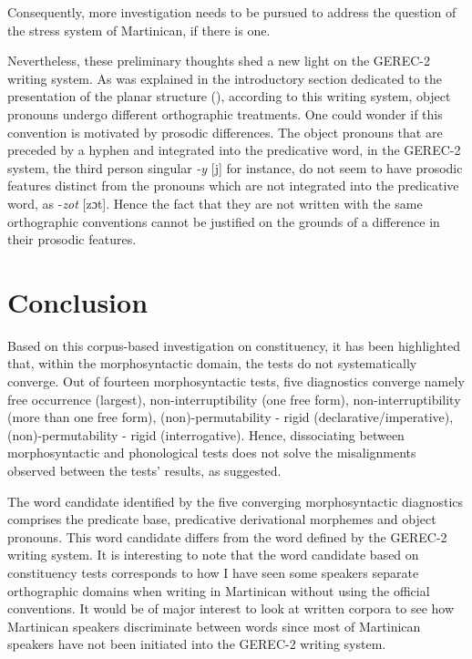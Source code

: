 \documentclass[output=paper]{langscibook}
\begin{document}
Consequently, more investigation needs to be pursued to address the question of the stress system of Martinican, if there is one.

Nevertheless, these preliminary thoughts shed a new light on the GEREC-2 writing system. As was explained in the introductory section dedicated to the presentation of the planar structure (), according to this writing system, object pronouns undergo different orthographic treatments. One could wonder if this convention is motivated by prosodic differences. The object pronouns that are preceded by a hyphen and integrated into the predicative word, in the GEREC-2 system, the third person singular \textit{{}-y} [j] for instance, do not seem to have prosodic features distinct from the pronouns which are not integrated into the predicative word, as -\textit{zot} [zɔt]. Hence the fact that they are not written with the same orthographic conventions cannot be justified on the grounds of a difference in their prosodic features.

\section{Conclusion}

Based on this corpus-based investigation on constituency, it has been highlighted that, within the morphosyntactic domain, the tests do not systematically converge. Out of fourteen morphosyntactic tests, five diagnostics converge namely free occurrence (largest), non-interruptibility (one free form), non-interrupti\-bil\-i\-ty (more than one free form), (non)-permutability - rigid (declarative/imperative), (non)-permutability - rigid (interrogative). Hence, dissociating between morpho\-syntactic and phonological tests does not solve the misalignments observed between the tests' results, as \citet[2]{tallman2021constituency} suggested.

The word candidate identified by the five converging morphosyntactic diagnostics comprises the predicate base, predicative derivational morphemes and object pronouns. This word candidate differs from the word defined by the GEREC-2 writing system. It is interesting to note that the word candidate based on constituency tests corresponds to how I have seen some speakers separate orthographic domains when writing in Martinican without using the official conventions. It would be of major interest to look at written corpora to see how Martinican speakers discriminate between words since most of Martinican speakers have not been initiated into the GEREC-2 writing system.
\end{document}
